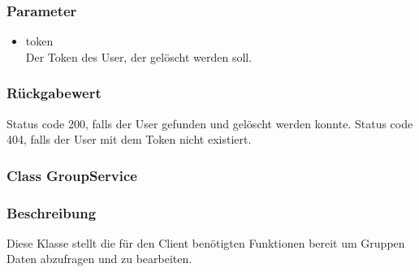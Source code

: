 \documentclass[a4paper]{scrreprt}
\begin{document}
\begin{addmargin}[25pt]{0pt}
\begin{itemize}
	\subsubsection*{Parameter}
	\begin{itemize}
	\item token \\
		Der Token des User, der gelöscht werden soll.
	\end{itemize}

	\subsubsection*{Rückgabewert}
	Status code 200, falls der User gefunden und gelöscht werden konnte.
	Status code 404, falls der User mit dem Token nicht existiert.
	
\end{itemize}
\end{addmargin}


\subsubsection{Class GroupService}
\subsubsection*{Beschreibung}
Diese Klasse stellt die für den Client benötigten Funktionen bereit um Gruppen Daten abzufragen und zu bearbeiten. 
\end{document}
